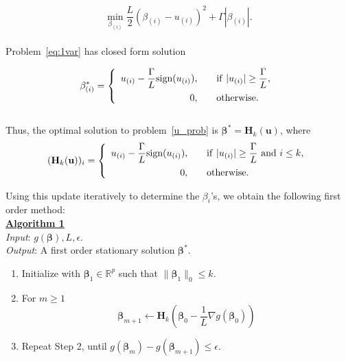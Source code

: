 \documentclass[12pt]{article}
\newcommand{\M}{\mathbf}
\newcommand{\MS}{\boldsymbol}
\newcommand{\R}{\mathbb{R}}
\newcommand{\1}{\mathds{1}}
\begin{document}
\begin{equation}
\label{eq:1var}
\min \limits_{\beta_{(i)}} \frac{L}{2}(\beta_{(i)} - u_{(i)})^2 + \Gamma |\beta_{(i)} |.
\end{equation}\\

Problem~\ref{eq:1var} has closed form solution

\begin{equation}
\beta_{(i)}^* = \left\{\begin{array}{rl} 
u_{(i)} - \displaystyle \frac{\Gamma}{L}\text{sign}(u_{(i)}), &~~~{\rm if}~|u_{(i)}| \ge \displaystyle \frac{\Gamma}{L}, \vspace{5pt}\\
0, &~~~\rm{otherwise.}
\end{array} \right.
\end{equation}\\

Thus, the optimal solution to problem~\ref{u_prob} is $\MS \beta^* = \M H_k(\M u)$, where
\begin{equation}
(\M H_k(\M u))_i = \left\{\begin{array}{rl} 
u_{(i)} - \displaystyle \frac{\Gamma}{L}\text{sign}(u_{(i)}), &~~~{\rm if}~|u_{(i)}| \ge \displaystyle \frac{\Gamma}{L}~{\rm and}~i \le k, \vspace{5pt}\\
0, &~~~\rm{otherwise.}
\end{array} \right.
\end{equation}

Using this update iteratively to determine the $\beta_i$'s, we obtain the following first order method:\\

\underline{\bf Algorithm 1}\\

\emph{Input}: $g(\MS \beta), L, \epsilon$.\\

\emph{Output}: A first order stationary solution $\MS \beta^*$.

\begin{enumerate}
	\item Initialize with $\MS \beta_1 \in \R^p$ such that $\|\MS \beta_1\|_0 \le k$.
	\item For $m \ge 1$
	\[
	\MS \beta_{m+1} \leftarrow \M H_k(\MS \beta_0 - \frac{1}{L} \nabla g(\MS \beta_0))
	\]
	\item Repeat Step 2, until $g(\MS \beta_m) - g(\MS \beta_{m+1}) \le \epsilon$.
\end{enumerate}
\end{document}
